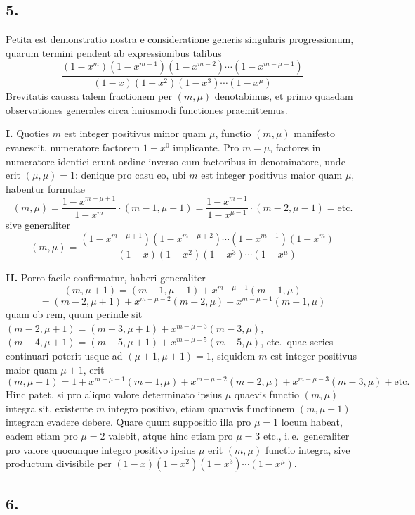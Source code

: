 \documentclass[12pt,a4paper]{article}
\theoremstyle{plain}
\begin{document}
\subsection*{5.}

Petita est demonstratio nostra e consideratione generis singularis progressionum, quarum termini pendent ab expressionibus talibus
\[
\frac{(1-x^m)(1-x^{m-1})(1-x^{m-2}) \cdots (1-x^{m-\mu+1})}{(1-x)(1-x^2)(1-x^3) \cdots (1-x^{\mu})}
\]
Brevitatis caussa talem fractionem per $(m, \mu)$ denotabimus, et primo quasdam observationes generales circa huiusmodi functiones praemittemus.

\medskip
\noindent\textbf{I.} Quoties $m$ est integer positivus minor quam $\mu$, functio $(m, \mu)$ manifesto evanescit, numeratore factorem $1-x^0$ implicante. Pro $m = \mu$, factores in numeratore identici erunt ordine inverso cum factoribus in denominatore, unde erit $(\mu, \mu) = 1$: denique pro casu eo, ubi $m$ est integer positivus maior quam $\mu$, habentur formulae
\[
(m, \mu) = \frac{1-x^{m-\mu+1}}{1-x^m} \cdot (m-1, \mu-1) = \frac{1-x^{m-1}}{1-x^{\mu-1}} \cdot (m-2, \mu-1) = \text{etc.}
\]
sive generaliter
\[
(m, \mu) = \frac{(1-x^{m-\mu+1})(1-x^{m-\mu+2}) \cdots (1-x^{m-1})(1-x^m)}{(1-x)(1-x^2)(1-x^3) \cdots (1-x^{\mu})}
\]

\medskip
\noindent\textbf{II.} Porro facile confirmatur, haberi generaliter
\[
(m, \mu+1) = (m-1, \mu+1) + x^{m-\mu-1}(m-1, \mu)
\]
\[
= (m-2, \mu+1) + x^{m-\mu-2}(m-2, \mu) + x^{m-\mu-1}(m-1, \mu)
\]
quam ob rem, quum perinde sit $(m-2, \mu+1) = (m-3, \mu+1) + x^{m-\mu-3}(m-3, \mu)$, $(m-4, \mu+1) = (m-5, \mu+1) + x^{m-\mu-5}(m-5, \mu)$, etc.\ quae series continuari poterit usque ad $(\mu+1, \mu+1) = 1$, siquidem $m$ est integer positivus maior quam $\mu+1$, erit
\[
(m, \mu+1) = 1 + x^{m-\mu-1}(m-1, \mu) + x^{m-\mu-2}(m-2, \mu) + x^{m-\mu-3}(m-3, \mu) + \text{etc.}
\]
Hinc patet, si pro aliquo valore determinato ipsius $\mu$ quaevis functio $(m, \mu)$ integra sit, existente $m$ integro positivo, etiam quamvis functionem $(m, \mu+1)$ integram evadere debere. Quare quum suppositio illa pro $\mu = 1$ locum habeat, eadem etiam pro $\mu = 2$ valebit, atque hinc etiam pro $\mu = 3$ etc., i.\,e.\ generaliter pro valore quocunque integro positivo ipsius $\mu$ erit $(m, \mu)$ functio integra, sive productum divisibile per $(1-x)(1-x^2)(1-x^3) \cdots (1-x^{\mu})$.

\subsection*{6.}
\end{document}
